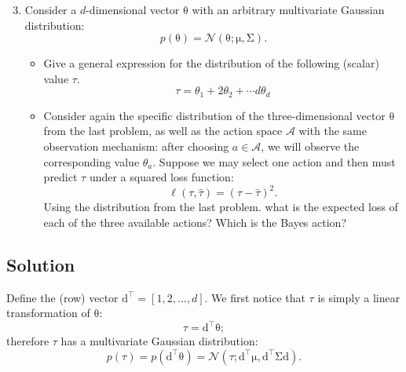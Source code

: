 \documentclass{article}
\newcommand{\mc}[1]{\mathcal{#1}}
\newcommand{\trans}{^\top}
\newcommand{\mat}[1]{\bm{\mathrm{#1}}}
\renewcommand{\vec}[1]{\bm{\mathrm{#1}}}
\begin{document}
\clearpage
\begin{enumerate}
\setcounter{enumi}{2}
\item
  Consider a $d$-dimensional vector $\vec{\theta}$ with an arbitrary
  multivariate Gaussian distribution:
  \begin{equation*}
    p(\vec{\theta})
    =
    \mc{N}(\vec{\theta}; \vec{\mu}, \mat{\Sigma}).
  \end{equation*}
  \begin{itemize}
  \item
    Give a general expression for the distribution of the following
    (scalar) value $\tau$.
    \begin{equation*}
      \tau = \theta_1 + 2\theta_2 + \dotsb d\theta_d
    \end{equation*}
  \item
    Consider again the specific distribution of the three-dimensional
    vector $\vec{\theta}$ from the last problem, as well as the action
    space $\mc{A}$ with the same observation mechanism: after choosing
    $a \in \mc{A}$, we will observe the corresponding value
    $\theta_a$.  Suppose we may select one action and then must
    predict $\tau$ under a squared loss function:
    \begin{equation*}
      \ell(\tau, \hat{\tau}) = (\tau - \hat{\tau})^2.
    \end{equation*}
    Using the distribution from the last problem. what is the expected
    loss of each of the three available actions?  Which is the Bayes
    action?
  \end{itemize}
\end{enumerate}

\subsection*{Solution}

Define the (row) vector $\vec{d}\trans = [1, 2, \dotsc, d]$.  We first
notice that $\tau$ is simply a linear transformation of
$\vec{\theta}$:
\begin{equation*}
  \tau = \vec{d}\trans \vec{\theta};
\end{equation*}
therefore $\tau$ has a multivariate Gaussian distribution:
\begin{equation*}
  p(\tau)
  =
  p(\vec{d}\trans \vec{\theta})
  =
  \mc{N}(\tau; \vec{d}\trans \vec{\mu}, \vec{d}\trans \mat{\Sigma} \vec{d}).
\end{equation*}
\end{document}
